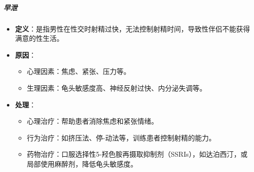 \subparagraph{早泄}
\begin{itemize}
\item \textbf{定义}：是指男性在性交时射精过快，无法控制射精时间，导致性伴侣不能获得满意的性生活。
\item \textbf{原因}：
  \begin{itemize}
  \item 心理因素：焦虑、紧张、压力等。
  \item 生理因素：龟头敏感度高、神经反射过快、内分泌失调等。
  \end{itemize}
\item \textbf{处理}：
  \begin{itemize}
  \item 心理治疗：帮助患者消除焦虑和紧张情绪。
  \item 行为治疗：如挤压法、停-动法等，训练患者控制射精的能力。
  \item 药物治疗：口服选择性5-羟色胺再摄取抑制剂（SSRIs），如达泊西汀，或局部使用麻醉剂，降低龟头敏感度。
  \end{itemize}
\end{itemize}

